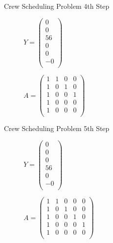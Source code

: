 \documentclass{beamer}
\begin{document}
\begin{frame}{Crew Scheduling Problem}
    4th Step
    \begin{figure}[!htb]
        \begin{minipage}{0.48\textwidth}
            \centering
            $Y = \begin{pmatrix}0\\ 0\\ 56\\ 0\\ 0\\ -0\\ \end{pmatrix}$
            \end{minipage}
        \begin{minipage}{0.48\textwidth}
            $A = \begin{pmatrix}
                1 & 1 & 0 & 0 \\
                1 & 0 & 1 & 0 \\
                1 & 0 & 0 & 1 \\
                1 & 0 & 0 & 0 \\
                1 & 0 & 0 & 0 \\
            \end{pmatrix}$
        \end{minipage}
    \end{figure}
\end{frame}

\begin{frame}{Crew Scheduling Problem}
    5th Step
    \begin{figure}[!htb]
        \begin{minipage}{0.48\textwidth}
            \centering
            $Y = \begin{pmatrix}0\\ 0\\ 0\\ 56\\ 0\\ -0\\ \end{pmatrix}$
            \end{minipage}
        \begin{minipage}{0.48\textwidth}
            $A = \begin{pmatrix}
                1 & 1 & 0 & 0 & 0 \\
                1 & 0 & 1 & 0 & 0 \\
                1 & 0 & 0 & 1 & 0 \\
                1 & 0 & 0 & 0 & 1 \\
                1 & 0 & 0 & 0 & 0 \\
            \end{pmatrix}$
        \end{minipage}
    \end{figure}
\end{frame}
\end{document}
